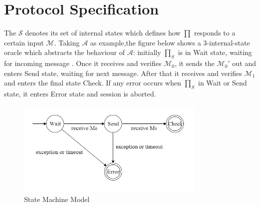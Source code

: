 \section*{Protocol Specification}
The $\mathcal{S}$ denotes its set of internal states which defines how $\prod$ responds to a certain input $\mathcal{M}$. Taking $\mathcal{A}$ as example,the figure below shows a 3-internal-state oracle which abstracts the behaviour of $\mathcal{A}$: initially $\prod_S$ is in Wait state, waiting for incoming message
. Once it receives and verifies $\mathcal{M}_0$, it sends the $\mathcal{M}_0'$ out and enters Send state, waiting for next message. After that it receives and verifies  $\mathcal{M}_1$ and enters the final state Check. If any error occurs when $\prod_S$ in Wait or Send state, it enters Error state and session is aborted.

\begin{figure}[h!]
\centering
\includegraphics[width=0.8\textwidth,natwidth=585,natheight=298]{statemachinefigure.png}
\caption{State Machine Model}
\end{figure}